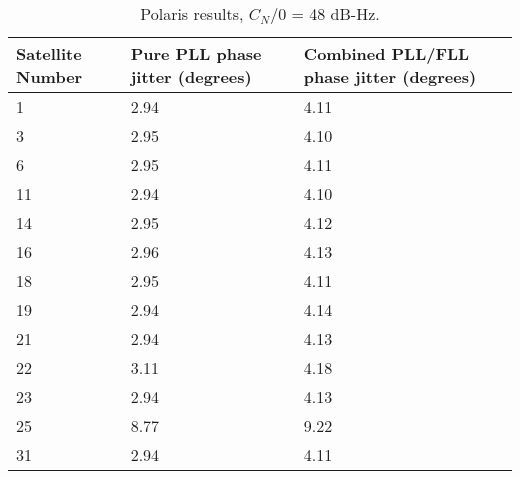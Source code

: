 \begin{table}[!htb]
\centering
\begin{tabular}{|l|l|l|}
\hline
\rowcolor[HTML]{C0C0C0} 
Satellite Number & Pure PLL phase jitter (degrees) & Combined PLL/FLL phase jitter (degrees) \\ \hline
1                & 2.94                            & 4.11                                    \\ \hline
\rowcolor[HTML]{EFEFEF} 
3                & 2.95                            & 4.10                                    \\ \hline
6                & 2.95                            & 4.11                                    \\ \hline
\rowcolor[HTML]{EFEFEF} 
11               & 2.94                            & 4.10                                    \\ \hline
14               & 2.95                            & 4.12                                    \\ \hline
\rowcolor[HTML]{EFEFEF} 
16               & 2.96                            & 4.13                                    \\ \hline
18               & 2.95                            & 4.11                                    \\ \hline
\rowcolor[HTML]{EFEFEF} 
19               & 2.94                            & 4.14                                    \\ \hline
21               & 2.94                            & 4.13                                    \\ \hline
\rowcolor[HTML]{EFEFEF} 
22               & 3.11                            & 4.18                                    \\ \hline
23               & 2.94                            & 4.13                                    \\ \hline
\rowcolor[HTML]{EFEFEF} 
25               & 8.77                            & 9.22                                    \\ \hline
31               & 2.94                            & 4.11                                    \\ \hline
\end{tabular}
\caption{Polaris results, $C_N/0$ = 48 dB-Hz.}
\label{tab:PolarisResultsCNO48}
\end{table}


